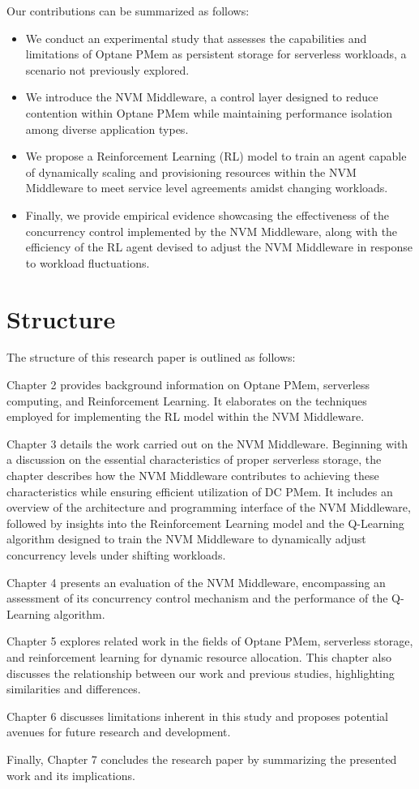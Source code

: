 Our contributions can be summarized as follows:

\begin{itemize}
    \item We conduct an experimental study that assesses the capabilities and limitations of Optane PMem as persistent storage for serverless workloads, a scenario not previously explored.
    \item We introduce the NVM Middleware, a control layer designed to reduce contention within Optane PMem while maintaining performance isolation among diverse application types.
    \item We propose a Reinforcement Learning (RL) model to train an agent capable of dynamically scaling and provisioning resources within the NVM Middleware to meet service level agreements amidst changing workloads.
    \item Finally, we provide empirical evidence showcasing the effectiveness of the concurrency control implemented by the NVM Middleware, along with the efficiency of the RL agent devised to adjust the NVM Middleware in response to workload fluctuations.
\end{itemize}

\section{Structure}

The structure of this research paper is outlined as follows:

Chapter 2 provides background information on Optane PMem, serverless computing, and Reinforcement Learning. It elaborates on the techniques employed for implementing the RL model within the NVM Middleware.

Chapter 3 details the work carried out on the NVM Middleware. Beginning with a discussion on the essential characteristics of proper serverless storage, the chapter describes how the NVM Middleware contributes to achieving these characteristics while ensuring efficient utilization of DC PMem. It includes an overview of the architecture and programming interface of the NVM Middleware, followed by insights into the Reinforcement Learning model and the Q-Learning algorithm designed to train the NVM Middleware to dynamically adjust concurrency levels under shifting workloads.

Chapter 4 presents an evaluation of the NVM Middleware, encompassing an assessment of its concurrency control mechanism and the performance of the Q-Learning algorithm.

Chapter 5 explores related work in the fields of Optane PMem, serverless storage, and reinforcement learning for dynamic resource allocation. This chapter also discusses the relationship between our work and previous studies, highlighting similarities and differences.

Chapter 6 discusses limitations inherent in this study and proposes potential avenues for future research and development.

Finally, Chapter 7 concludes the research paper by summarizing the presented work and its implications.
